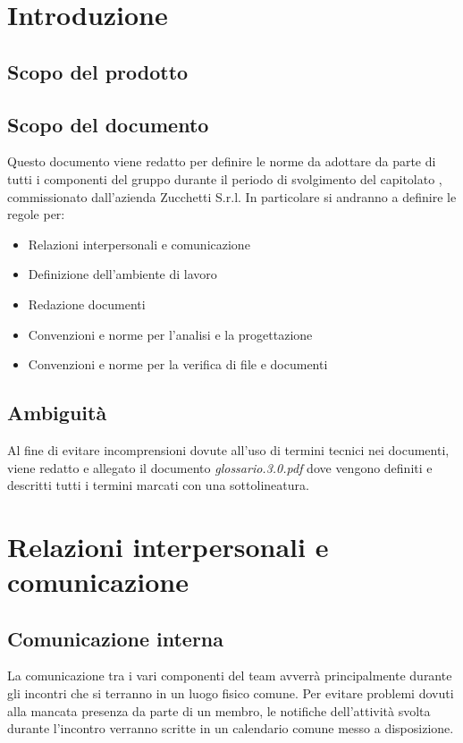 \setcounter{page}{1}
\pagestyle{normal}

\newpage
\section{Introduzione}
\subsection{Scopo del prodotto}
\purpose

\subsection{Scopo del documento}
Questo documento viene redatto per definire le norme da adottare da parte di tutti i componenti del gruppo \team{} durante il periodo di svolgimento del capitolato \caName, commissionato dall'azienda Zucchetti S.r.l. In particolare si andranno a definire le regole per:
\begin{itemize}
\item Relazioni interpersonali e comunicazione
\item Definizione dell'ambiente di lavoro
\item Redazione documenti
\item Convenzioni e norme per l'analisi e la progettazione
\item Convenzioni e norme per la verifica di file e documenti
\end{itemize}

\subsection{Ambiguità}
Al fine di evitare incomprensioni dovute all'uso di termini tecnici nei documenti, viene redatto e allegato il documento \textit{glossario.3.0.pdf} dove vengono definiti e descritti tutti i termini marcati con una sottolineatura.
\clearpage

\section{Relazioni interpersonali e comunicazione}
\subsection{Comunicazione interna}
\label{sec:comunicazione_interna}
La comunicazione tra i vari componenti del team avverrà principalmente durante gli incontri che si terranno in un luogo fisico comune. Per evitare problemi dovuti alla mancata presenza da parte di un membro, le notifiche dell'attività svolta durante l'incontro verranno scritte in un calendario comune messo a disposizione.

